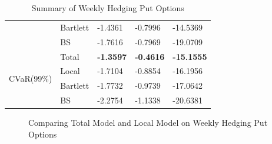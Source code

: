 \documentclass[letterpaper,12pt,titlepage,oneside,final]{book}
\numberwithin{equation}{section}
\theoremstyle{definition}
\begin{document}
\begin{table}[htp!]
\begin{tabular}{ll|l|l|l|}
	\multicolumn{1}{|l|}{}                                & Bartlett & -1.4361          & -0.7996          & -14.5369          \\  
	\multicolumn{1}{|l|}{}                                & BS       & -1.7616          & -0.7969          & -19.0709          \\ \hline
	\multicolumn{1}{|l|}{\multirow{4}{*}{CVaR(99\%)}}     & Total    & \textbf{-1.3597} & \textbf{-0.4616} & \textbf{-15.1555} \\  
	\multicolumn{1}{|l|}{}                                & Local    & -1.7104          & -0.8854          & -16.1956          \\ 
	\multicolumn{1}{|l|}{}                                & Bartlett & -1.7732          & -0.9739          & -17.0642          \\ 
	\multicolumn{1}{|l|}{}                                & BS       & -2.2754          & -1.1338          & -20.6381          \\ \hline
	\end{tabular}
	\caption{Summary of Weekly Hedging Put Options} \label{table:putTotalW}
	\end{table}

\newpage
\begin{figure}[htp!]
	\centering

	\caption{Comparing Total Model and Local Model on Weekly Hedging Put Options} \label{fig:putTotalW1}
	\end{figure}
\end{document}
